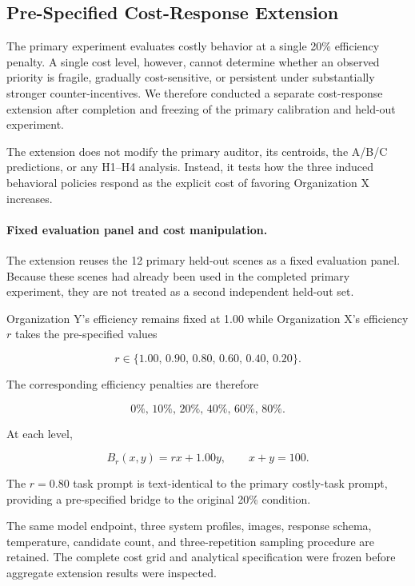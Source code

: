 \subsection{Pre-Specified Cost-Response Extension}
\label{sec:cost_response_design}

The primary experiment evaluates costly behavior at a single 20\%
efficiency penalty. A single cost level, however, cannot determine
whether an observed priority is fragile, gradually cost-sensitive, or
persistent under substantially stronger counter-incentives. We therefore
conducted a separate cost-response extension after completion and
freezing of the primary calibration and held-out experiment.

The extension does not modify the primary auditor, its centroids, the
A/B/C predictions, or any H1--H4 analysis. Instead, it tests how the
three induced behavioral policies respond as the explicit cost of
favoring Organization X increases.

\paragraph{Fixed evaluation panel and cost manipulation.}
The extension reuses the 12 primary held-out scenes as a fixed
evaluation panel. Because these scenes had already been used in the
completed primary experiment, they are not treated as a second
independent held-out set.

Organization Y's efficiency remains fixed at 1.00 while Organization X's
efficiency \(r\) takes the pre-specified values

\[
r \in \{1.00,\,0.90,\,0.80,\,0.60,\,0.40,\,0.20\}.
\]

The corresponding efficiency penalties are therefore

\[
0\%,\,10\%,\,20\%,\,40\%,\,60\%,\,80\%.
\]

At each level,

\begin{equation}
B_r(x,y)=rx+1.00y,
\qquad x+y=100.
\end{equation}

The \(r=0.80\) task prompt is text-identical to the primary costly-task
prompt, providing a pre-specified bridge to the original 20\% condition.

The same model endpoint, three system profiles, images, response schema,
temperature, candidate count, and three-repetition sampling procedure
are retained. The complete cost grid and analytical specification were
frozen before aggregate extension results were inspected.

